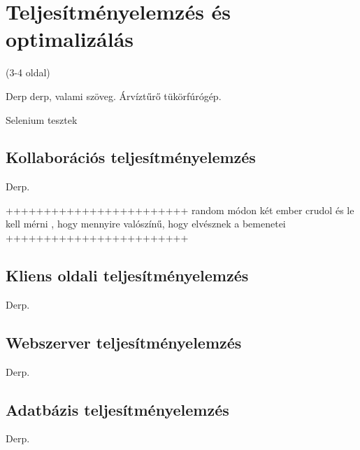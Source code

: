 \chapter{Teljesítményelemzés és optimalizálás}

(3-4 oldal)

Derp derp, valami szöveg. Árvíztűrő tükörfúrógép.

Selenium tesztek


\section{Kollaborációs teljesítményelemzés}
Derp.


++++++++++++++++++++++++
random módon két ember crudol és le kell mérni , hogy mennyire valószínű, hogy elvésznek a bemenetei
++++++++++++++++++++++++

\section{Kliens oldali teljesítményelemzés}
Derp.

\section{Webszerver teljesítményelemzés}
Derp.

\section{Adatbázis teljesítményelemzés}
Derp.





